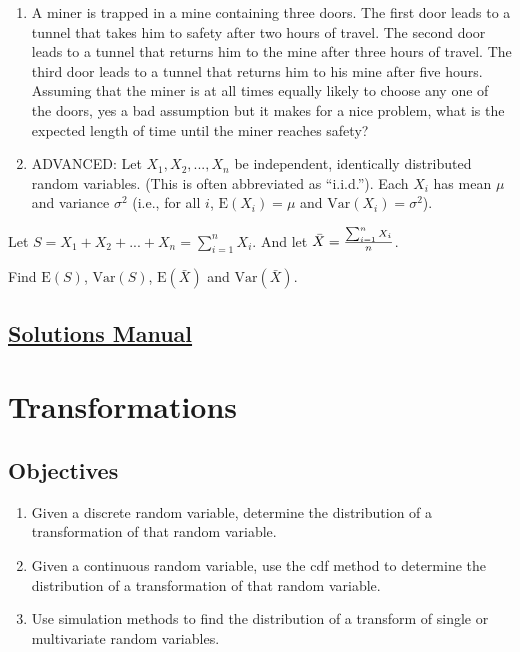 \documentclass[
  letterpaper,
  DIV=11,
  numbers=noendperiod]{scrreprt}
\providecommand{\tightlist}{%
  \setlength{\itemsep}{0pt}\setlength{\parskip}{0pt}}\usepackage{longtable,booktabs,array}
\begin{document}
\begin{enumerate}
\def\labelenumi{\arabic{enumi}.}
\setcounter{enumi}{4}
\item
  A miner is trapped in a mine containing three doors. The first door
  leads to a tunnel that takes him to safety after two hours of travel.
  The second door leads to a tunnel that returns him to the mine after
  three hours of travel. The third door leads to a tunnel that returns
  him to his mine after five hours. Assuming that the miner is at all
  times equally likely to choose any one of the doors, yes a bad
  assumption but it makes for a nice problem, what is the expected
  length of time until the miner reaches safety?
\item
  ADVANCED: Let \(X_1,X_2,...,X_n\) be independent, identically
  distributed random variables. (This is often abbreviated as
  ``i.i.d.''). Each \(X_i\) has mean \(\mu\) and variance \(\sigma^2\)
  (i.e., for all \(i\), \(\mbox{E}(X_i)=\mu\) and
  \(\mbox{Var}(X_i)=\sigma^2\)).
\end{enumerate}

Let \(S=X_1+X_2+...+X_n=\sum_{i=1}^n X_i\). And let
\(\bar{X}={\sum_{i=1}^n X_i \over n}\).

Find \(\mbox{E}(S)\), \(\mbox{Var}(S)\), \(\mbox{E}(\bar{X})\) and
\(\mbox{Var}(\bar{X})\).

\section*{\texorpdfstring{\href{https://ds-usafa.github.io/CPS-Solutions-Manual/MULTIEXP.html}{Solutions
Manual}}{Solutions Manual}}\label{solutions-manual-15}


\chapter{Transformations}\label{TRANSF}

\section{Objectives}\label{objectives-16}

\begin{enumerate}
\def\labelenumi{\arabic{enumi})}
\tightlist
\item
  Given a discrete random variable, determine the distribution of a
  transformation of that random variable.\\
\item
  Given a continuous random variable, use the cdf method to determine
  the distribution of a transformation of that random variable.\\
\item
  Use simulation methods to find the distribution of a transform of
  single or multivariate random variables.
\end{enumerate}
\end{document}
